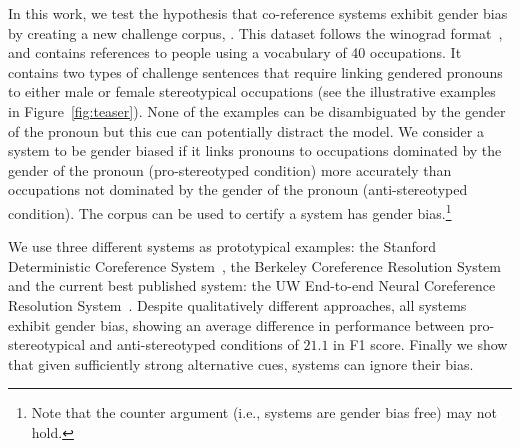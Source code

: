 In this work, we test the hypothesis that co-reference systems exhibit gender bias by creating a new challenge corpus, \dataset.%
This dataset follows the winograd format~\cite{hirst,RahmanNg12c,peng2015solving}, and contains references to people using a vocabulary of 40 occupations.
It contains two types of challenge sentences that require linking gendered pronouns to either male or female stereotypical occupations (see the illustrative examples in Figure~\ref{fig:teaser}).
None of the examples can be disambiguated by the gender of the pronoun but this cue can potentially distract the model. 
We consider a system to be gender biased if it links pronouns to occupations dominated by the gender of the pronoun (pro-stereotyped condition) more accurately than occupations not dominated by the gender of the pronoun (anti-stereotyped condition).
The corpus can be used to certify a system has gender bias.\footnote{Note that the counter argument (i.e., systems are gender bias free) may not hold.}

We use three different systems as prototypical examples: the Stanford Deterministic Coreference System~\cite{raghunathan2010multi}, the Berkeley Coreference Resolution System~\cite{DurrettKlein2013} and the current best published system: the UW End-to-end Neural Coreference Resolution System~\cite{lee2017end}.
Despite qualitatively different approaches, all systems exhibit gender bias, showing an average difference in performance between pro-stereotypical and anti-stereotyped conditions of $21.1$ in F1 score.
Finally we show that given sufficiently strong alternative cues, systems can ignore their bias. 

